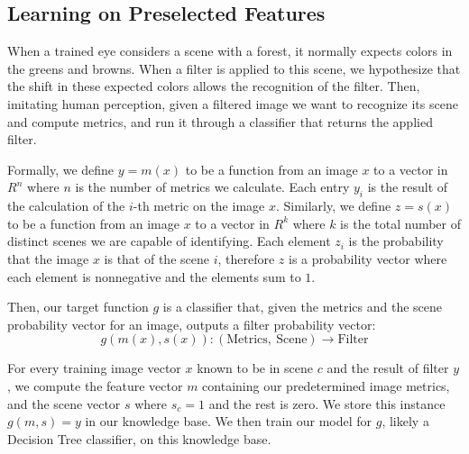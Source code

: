 \documentclass[a4paper, 11pt]{article}
\DeclareMathOperator{\dist}{dist}
\begin{document}
\subsection*{Learning on Preselected Features}
When a trained eye considers a scene with a forest, it normally expects colors in the greens and browns. When a filter is applied to this scene, we hypothesize that the shift in these expected colors allows the recognition of the filter. Then, imitating human perception, given a filtered image we want to recognize its scene and compute metrics, and run it through a classifier that returns the applied filter.

Formally, we define $y = m(x)$ to be a function from an image $x$ to a vector in $R^n$ where $n$ is the number of metrics we calculate. Each entry $y_i$ is the result of the calculation of the $i$-th metric on the image $x$. Similarly, we define $z = s(x)$ to be a function from an image $x$ to a vector in $R^k$ where $k$ is the total number of distinct scenes we are capable of identifying. Each element $z_i$ is the probability that the image $x$ is that of the scene $i$, therefore $z$ is a probability vector where each element is nonnegative and the elements sum to $1$.

Then, our target function $g$ is a classifier that, given the metrics and the scene probability vector for an image, outputs a filter probability vector:
$$g(m(x), s(x)) : (\text{Metrics},\ \text{Scene}) \to \text{Filter}$$



For every training image vector $x$ known to be in scene $c$ and the result of filter $y$, we compute the feature vector $m$ containing our predetermined image metrics, and the scene vector $s$ where $s_c = 1$ and the rest is zero. We store this instance $g(m, s) = y$ in our knowledge base. We then train our model for $g$, likely a Decision Tree classifier, on this knowledge base.
\end{document}
